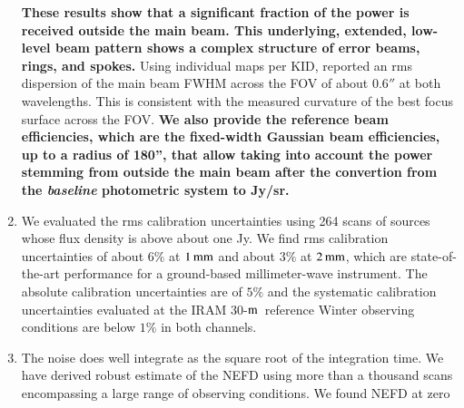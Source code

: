 \documentclass[traditionalabstract]{aa}
\newcommand{\bm}{{\tt beammap}}
\newcommand{\trentemetre}{30-$\rm{m}$}
\newcommand{\lp}[1]{\bf \color[RGB]{230, 0, 92} #1}
\begin{document}
\begin{enumerate}
  {\lp These results show that a significant fraction of the power is received
    outside the main beam. This underlying,
    extended, low-level beam pattern shows a complex structure of error 
    beams, rings, and spokes.}
  Using individual maps per KID, \citet{Adam2018} reported an rms
  dispersion of the main beam FWHM across the FOV of about $0.6''$ at
  both wavelengths. This is consistent with the measured curvature of
  the best focus surface across the FOV. 
  {\lp We also provide the reference beam efficiencies, which are the
    fixed-width Gaussian beam efficiencies, up to a radius
    of 180'', that allow taking into account the power stemming from
    outside the main beam after the convertion from the \emph{baseline} 
    photometric system to Jy/sr.} 
%
  \vspace{1mm}
\item %
  We evaluated the rms calibration uncertainties using 264 
  scans of sources whose flux density is above about one Jy. We find rms calibration
  uncertainties of about $6\%$ at $1\,\rm{mm}$ and about $3\%$ at
  $2\,\rm{mm}$, which are state-of-the-art performance for a
  ground-based millimeter-wave instrument. The absolute
  calibration uncertainties are of $5\%$ and the systematic
  calibration uncertainties evaluated at the IRAM
  \trentemetre\ reference Winter observing conditions are
  below $1\%$ in both channels.
   \vspace{1mm}
\item %
  The noise does well integrate as the square root of the integration time. We
  have derived robust estimate of the NEFD using more than a thousand scans
  encompassing a large range of observing conditions. We found NEFD at zero

\end{enumerate}
\end{document}
